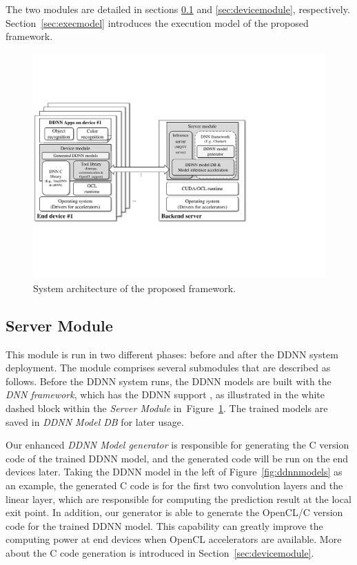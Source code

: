 \documentclass[format=acmsmall, review=false, screen=true]{acmart}
\def\figurename{Figure}
\def\sectionname{Section}
\begin{document}
The two modules are detailed in sections \ref{sec:servermodule} and \ref{sec:devicemodule}, respectively. \sectionname~\ref{sec:execmodel} introduces the execution model of the proposed framework.


	
    \begin{figure}[tbh]
        \centering
        \includegraphics[width=.7\columnwidth]{figure/DDNNCF}
        \caption{System architecture of the proposed framework.}
        \label{fig:systemarchitecture} %
    \end{figure}

\subsection{Server Module}
\label{sec:servermodule}
This module is run in two different phases: before and after the DDNN system deployment. The module comprises several submodules that are described as follows. Before the DDNN system runs, the DDNN models are built with the \emph{DNN framework}, which has the DDNN support \cite{Teerapittayanon17}, as illustrated in the white dashed block within the \emph{Server Module} in~\figurename~\ref{fig:systemarchitecture}. The trained models are saved in \emph{DDNN Model DB} for later usage.

Our enhanced \emph{DDNN Model generator} is responsible for generating the C version code of the trained DDNN model, and the generated code will be run on the end devices later. Taking the DDNN model in the left of \figurename~\ref{fig:ddnnmodels} as an example, the generated C code is for the first two convolution layers and the linear layer, which are responsible for computing the prediction result at the local exit point. In addition, our generator is able to generate the OpenCL/C version code for the trained DDNN model. This capability can greatly improve the computing power at end devices when OpenCL accelerators are available. More about the C code generation is introduced in \sectionname~\ref{sec:devicemodule}.
\end{document}
